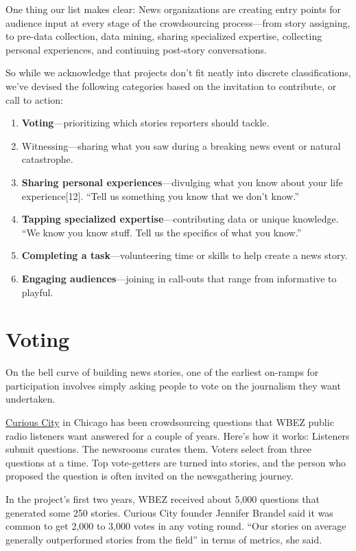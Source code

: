 \documentclass[notoc, symmetric, nobib, nols]{towcenter-guideto-book}
\begin{document}
One thing our list makes clear: News organizations are creating entry points for audience input at every stage of the crowdsourcing process---from story assigning, to pre-data collection, data mining, sharing specialized expertise, collecting personal experiences, and continuing post-story conversations.

So while we acknowledge that projects don't fit neatly into discrete classifications, we've devised the following categories based on the invitation to contribute, or call to action:
\begin{enumerate}
\item \textbf{Voting}---prioritizing which stories reporters should tackle. 
\item Witnessing---sharing what you saw during a breaking news event or natural catastrophe.
\item \textbf{Sharing personal experiences}---divulging what you know about your life experience[12]. ``Tell us something you know that we don't know.''
\item \textbf{Tapping specialized expertise}---contributing data or unique knowledge. ``We know you know stuff. Tell us the specifics of what you know.''
\item \textbf{Completing a task}---volunteering time or skills to help create a news story.
\item \textbf{Engaging audiences}---joining in call-outs that range from informative to playful.
\end{enumerate}


\section{Voting}  

On the bell curve of building news stories, one of the earliest on-ramps for participation involves simply asking people to vote on the journalism they want undertaken.

\href{http://curiouscity.wbez.org/}{Curious City}\autocite{Curious} in Chicago has been crowdsourcing questions that WBEZ public radio listeners want answered for a couple of years. Here's how it works: Listeners submit questions. The newsrooms curates them. Voters select from three questions at a time. Top vote-getters are turned into stories, and the person who proposed the question is often invited on the newsgathering journey. 

In the project's first two years, WBEZ received about 5,000 questions that generated some 250 stories. Curious City founder Jennifer Brandel said it was common to get 2,000 to 3,000 votes in any voting round. “Our stories on average generally outperformed stories from the field” in terms of metrics, she said.%
\end{document}
